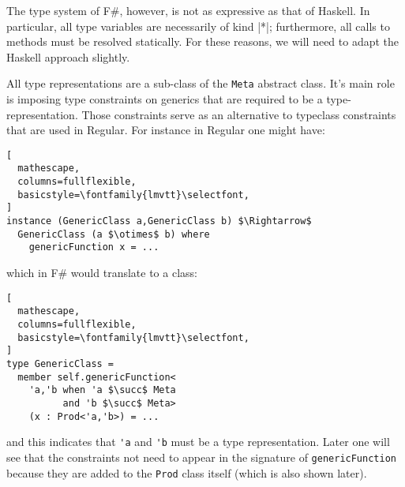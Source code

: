 \documentclass{sigplanconf}
\begin{document}
The type system of F\#, however, is not as expressive as that of
Haskell. In particular, all type variables are necessarily of kind
|*|; furthermore, all calls to methods must be resolved statically.
For these reasons, we will need to adapt the Haskell approach
slightly.

All type representations are a sub-class of the \verb+Meta+ abstract
class. It's main role is imposing type constraints on generics that
are required to be a type-representation. Those constraints serve as
an alternative to typeclass constraints that are used in Regular. For
instance in Regular one might have:

\begin{lstlisting}[
  mathescape,
  columns=fullflexible,
  basicstyle=\fontfamily{lmvtt}\selectfont,
]
instance (GenericClass a,GenericClass b) $\Rightarrow$
  GenericClass (a $\otimes$ b) where
    genericFunction x = ...

\end{lstlisting}

which in F\# would translate to a class:

\begin{lstlisting}[
  mathescape,
  columns=fullflexible,
  basicstyle=\fontfamily{lmvtt}\selectfont,
]
type GenericClass =
  member self.genericFunction<
    'a,'b when 'a $\succ$ Meta 
          and 'b $\succ$ Meta> 
    (x : Prod<'a,'b>) = ...
\end{lstlisting}
and this indicates that \verb+'a+ and \verb+'b+ must be a type
representation. Later one will see that the constraints not need to
appear in the signature of \verb+genericFunction+ because they are
added to the \verb+Prod+ class itself (which is also shown later).
\end{document}
